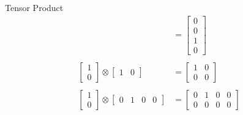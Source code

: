 \documentclass{beamer}
\begin{document}
\begin{frame}{Tensor Product}
{\begin{align*}
         &= \begin{bmatrix} 0 \\ 0 \\ 1 \\ 0 \end{bmatrix} \\
         \\
      \begin{bmatrix} 1 \\ 0 \end{bmatrix} \otimes \begin{bmatrix} 1 & 0 \end{bmatrix}
         &= \begin{bmatrix}
              1 & 0 \\
              0 & 0
            \end{bmatrix} \\
            \\
      \begin{bmatrix} 1 \\ 0 \end{bmatrix} \otimes \begin{bmatrix} 0 & 1 & 0 & 0 \end{bmatrix} &= \begin{bmatrix}
                                                                                            0 & 1 & 0 & 0\\
                                                                                            0 & 0 & 0 & 0
                                                                                          \end{bmatrix}
    \end{align*}
  }%
\end{frame}
\end{document}
